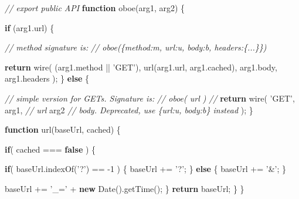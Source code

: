 \documentclass[12pt, ]{article}
\newenvironment{Shaded}{}{}
\newcommand{\KeywordTok}[1]{\textcolor[rgb]{0.00,0.44,0.13}{\textbf{{#1}}}}
\newcommand{\DecValTok}[1]{\textcolor[rgb]{0.25,0.63,0.44}{{#1}}}
\newcommand{\StringTok}[1]{\textcolor[rgb]{0.25,0.44,0.63}{{#1}}}
\newcommand{\CommentTok}[1]{\textcolor[rgb]{0.38,0.63,0.69}{\textit{{#1}}}}
\newcommand{\OtherTok}[1]{\textcolor[rgb]{0.00,0.44,0.13}{{#1}}}
\newcommand{\FunctionTok}[1]{\textcolor[rgb]{0.02,0.16,0.49}{{#1}}}
\newcommand{\NormalTok}[1]{{#1}}
\begin{document}
\begin{Shaded}
\begin{Highlighting}[]
\CommentTok{// export public API}
\KeywordTok{function} \FunctionTok{oboe}\NormalTok{(arg1, arg2) \{}

   \KeywordTok{if} \NormalTok{(}\OtherTok{arg1}\NormalTok{.}\FunctionTok{url}\NormalTok{) \{}

      \CommentTok{// method signature is:}
      \CommentTok{//    oboe(\{method:m, url:u, body:b, headers:\{...\}\})}

      \KeywordTok{return} \FunctionTok{wire}\NormalTok{(}
         \NormalTok{(}\OtherTok{arg1}\NormalTok{.}\FunctionTok{method} \NormalTok{|| }\StringTok{'GET'}\NormalTok{),}
         \FunctionTok{url}\NormalTok{(}\OtherTok{arg1}\NormalTok{.}\FunctionTok{url}\NormalTok{, }\OtherTok{arg1}\NormalTok{.}\FunctionTok{cached}\NormalTok{),}
         \OtherTok{arg1}\NormalTok{.}\FunctionTok{body}\NormalTok{,}
         \OtherTok{arg1}\NormalTok{.}\FunctionTok{headers}
      \NormalTok{);}
   \NormalTok{\} }\KeywordTok{else} \NormalTok{\{}

      \CommentTok{//  simple version for GETs. Signature is:}
      \CommentTok{//    oboe( url )            }
      \CommentTok{//                                }
      \KeywordTok{return} \FunctionTok{wire}\NormalTok{(}
         \StringTok{'GET'}\NormalTok{,}
         \NormalTok{arg1, }\CommentTok{// url}
         \NormalTok{arg2  }\CommentTok{// body. Deprecated, use \{url:u, body:b\} instead}
      \NormalTok{);}
   \NormalTok{\}}
   
   \KeywordTok{function} \FunctionTok{url}\NormalTok{(baseUrl, cached) \{}
     
      \KeywordTok{if}\NormalTok{( cached === }\KeywordTok{false} \NormalTok{) \{}
           
         \KeywordTok{if}\NormalTok{( }\OtherTok{baseUrl}\NormalTok{.}\FunctionTok{indexOf}\NormalTok{(}\StringTok{'?'}\NormalTok{) == -}\DecValTok{1} \NormalTok{) \{}
            \NormalTok{baseUrl += }\StringTok{'?'}\NormalTok{;}
         \NormalTok{\} }\KeywordTok{else} \NormalTok{\{}
            \NormalTok{baseUrl += }\StringTok{'&'}\NormalTok{;}
         \NormalTok{\}}
         
         \NormalTok{baseUrl += }\StringTok{'_='} \NormalTok{+ }\KeywordTok{new} \FunctionTok{Date}\NormalTok{().}\FunctionTok{getTime}\NormalTok{();}
      \NormalTok{\}}
      \KeywordTok{return} \NormalTok{baseUrl;}
   \NormalTok{\}}
\NormalTok{\}}
\end{Highlighting}
\end{Shaded}
\end{document}

